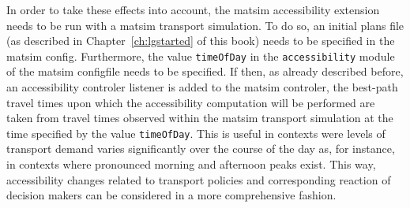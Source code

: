 
In order to take these effects into account, the \gls{matsim} accessibility extension needs to be run with a \gls{matsim} 
transport simulation. To do so, an initial plans file (as described in Chapter~\ref{ch:lgstarted} of this book) 
needs to be specified 
in the \gls{matsim} config. Furthermore, the value \lstinline{timeOfDay} in the \lstinline{accessibility} module of the \gls{matsim}
\gls{configfile} needs to be specified. If then, as already described before, an accessibility controler listener is added to 
the \gls{matsim} controler, the best-path travel times upon which the accessibility computation will be performed are taken 
from travel times observed within the \gls{matsim} transport simulation at the time specified by the value \lstinline{timeOfDay}.
This is useful in contexts were levels of transport demand varies significantly over the course of the day as, for instance, 
in contexts where pronounced morning and afternoon peaks exist. This way, accessibility changes related to transport policies
and corresponding reaction of decision makers can be considered in a more comprehensive fashion. 

